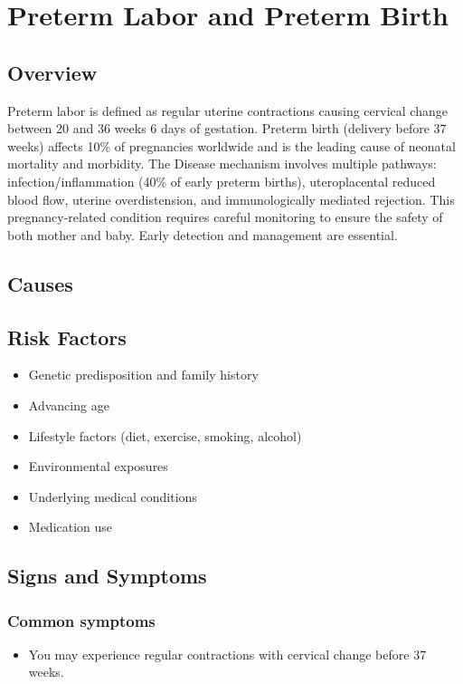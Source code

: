 \chapter{Preterm Labor and Preterm Birth}
\label{sec:Preterm Labor and Preterm Birth}

\section{Overview}
Preterm labor is defined as regular uterine contractions causing cervical change between 20 and 36 weeks 6 days of gestation. Preterm birth (delivery before 37 weeks) affects 10\% of pregnancies worldwide and is the leading cause of neonatal mortality and morbidity. The Disease mechanism involves multiple pathways: infection/inflammation (40\% of early preterm births), uteroplacental reduced blood flow, uterine overdistension, and immunologically mediated rejection. This pregnancy-related condition requires careful monitoring to ensure the safety of both mother and baby. Early detection and management are essential.
\section{Causes}
\section{Risk Factors}

\begin{itemize}[noitemsep]
  \item Genetic predisposition and family history
  \item Advancing age
  \item Lifestyle factors (diet, exercise, smoking, alcohol)
  \item Environmental exposures
  \item Underlying medical conditions
  \item Medication use
\end{itemize}
\section{Signs and Symptoms}

\subsection{Common symptoms}
\begin{itemize}[noitemsep]
  \item You may experience regular contractions with cervical change before 37 weeks. 
  \end{itemize}

